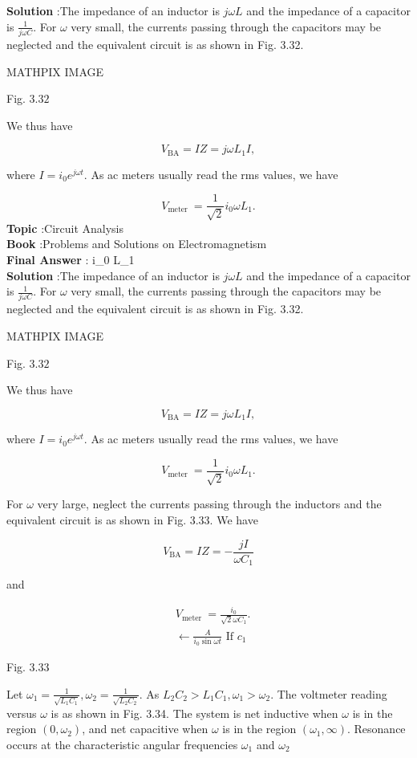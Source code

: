 \documentclass[10pt]{article}
\begin{document}
\textbf{Solution} :The impedance of an inductor is $j \omega L$ and the impedance of a capacitor is $\frac{1}{j \omega C}$. For $\omega$ very small, the currents passing through the capacitors may be neglected and the equivalent circuit is as shown in Fig. 3.32.

MATHPIX IMAGE

Fig. $3.32$

We thus have

$$
V_{\mathrm{BA}}=I Z=j \omega L_{1} I,
$$

where $I=i_{0} e^{j \omega t}$. As ac meters usually read the rms values, we have

$$
V_{\text {meter }}=\frac{1}{\sqrt{2}} i_{0} \omega L_{1} .
$$
\textbf{Topic} :Circuit Analysis\\
\textbf{Book} :Problems and Solutions on Electromagnetism\\
\textbf{Final Answer} : i_{0} \omega L_{1}\\


\textbf{Solution} :The impedance of an inductor is $j \omega L$ and the impedance of a capacitor is $\frac{1}{j \omega C}$. For $\omega$ very small, the currents passing through the capacitors may be neglected and the equivalent circuit is as shown in Fig. 3.32.

MATHPIX IMAGE

Fig. $3.32$

We thus have

$$
V_{\mathrm{BA}}=I Z=j \omega L_{1} I,
$$

where $I=i_{0} e^{j \omega t}$. As ac meters usually read the rms values, we have

$$
V_{\text {meter }}=\frac{1}{\sqrt{2}} i_{0} \omega L_{1} .
$$

 For $\omega$ very large, neglect the currents passing through the inductors and the equivalent circuit is as shown in Fig. 3.33. We have

$$
V_{\mathrm{BA}}=I Z=-\frac{j I}{\omega C_{1}}
$$

and

$$
\begin{aligned}
&V_{\text {meter }}=\frac{i_{0}}{\sqrt{2} \omega C_{1}} . \\
&\leftarrow \frac{A}{i_{0} \sin \omega t} \text { If } c_{1}
\end{aligned}
$$

Fig. $3.33$

 Let $\omega_{1}=\frac{1}{\sqrt{L_{1} C_{1}}}, \omega_{2}=\frac{1}{\sqrt{L_{2} C_{2}}}$. As $L_{2} C_{2}>L_{1} C_{1}, \omega_{1}>\omega_{2}$. The voltmeter reading versus $\omega$ is as shown in Fig. 3.34. The system is net inductive when $\omega$ is in the region $\left(0, \omega_{2}\right)$, and net capacitive when $\omega$ is in the region $\left(\omega_{1}, \infty\right)$. Resonance occurs at the characteristic angular frequencies $\omega_{1}$ and $\omega_{2}$
\end{document}
